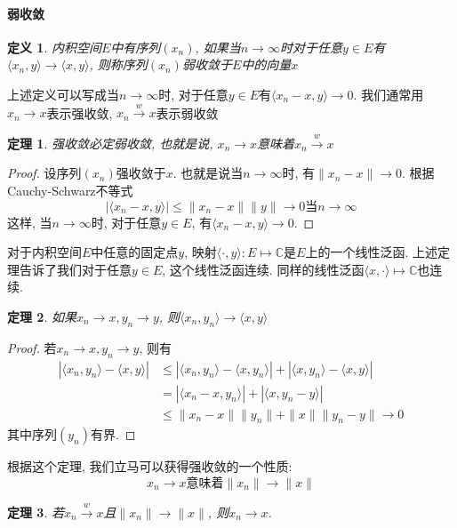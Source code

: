 \documentclass[a4paper,11pt]{article}
\newtheorem{definition}{\hspace{2em}定义}[section]
\newtheorem{theorem}{\hspace{2em}定理}[section]
\newtheorem{proof}{证明}[section]
\begin{document}
\paragraph*{弱收敛}
\begin{definition}
  内积空间$E$中有序列$(x_n)$, 如果当$n\to \infty$时对于任意$y\in E$有$\langle x_n,y\rangle\to\langle x,y\rangle$, 则称序列$(x_n)$弱收敛于$E$中的向量$x$
\end{definition}
上述定义可以写成当$n\to\infty$时, 对于任意$y\in E$有$\langle x_n-x,y\rangle\to 0$. 我们通常用$x_n\to x$表示强收敛, $x_n\stackrel{w}{\to} x$表示弱收敛
\begin{theorem}
  强收敛必定弱收敛, 也就是说, $x_n\to x$意味着$x_n\stackrel{w}{\to}x$
\end{theorem}
\begin{proof}
  设序列$(x_n)$强收敛于$x$. 也就是说当$n\to \infty$时, 有$\|x_n-x\|\to 0$. 根据Cauchy-Schwarz不等式
  \begin{equation*}
    |\langle x_n-x,y\rangle|\leq\|x_n-x\|\|y\|\to 0\text{当$n\to\infty$}
  \end{equation*}
  这样, 当$n\to \infty$时, 对于任意$y\in E$, 有$\langle x_n-x,y\rangle\to 0$.
\end{proof}
对于内积空间$E$中任意的固定点$y$, 映射$\langle\cdot,y\rangle:E\mapsto\mathbb{C}$是$E$上的一个线性泛函. 上述定理告诉了我们对于任意$y\in E$, 这个线性泛函连续. 同样的线性泛函$\langle x,\cdot\rangle\mapsto\mathbb{C}$也连续.
\begin{theorem}
  如果$x_n\to x,y_n\to y$, 则$\langle x_n,y_n\rangle\to\langle x,y\rangle$
\end{theorem}
\begin{proof}
  若$x_n\to x,y_n\to y$, 则有
  \begin{equation*}
  \begin{split}
     |\langle x_n,y_n\rangle-\langle x,y\rangle|& \leq|\langle x_n,y_n\rangle-\langle x,y_n\rangle|+|\langle x,y_n\rangle-\langle x,y\rangle| \\
       & =|\langle x_n-x,y_n\rangle|+|\langle x,y_n-y\rangle| \\
       & \leq\|x_n-x\|\|y_n\|+\|x\|\|y_n-y\|\to 0
  \end{split}
  \end{equation*}
  其中序列$(y_n)$有界.
\end{proof}
根据这个定理, 我们立马可以获得强收敛的一个性质:
\begin{equation*}
  x_n\to x\text{意味着$\|x_n\|\to\|x\|$}
\end{equation*}
\begin{theorem}
  若$x_n\stackrel{w}{\to}x$且$\|x_n\|\to\|x\|$, 则$x_n\to x$.
\end{theorem}
\end{document}
